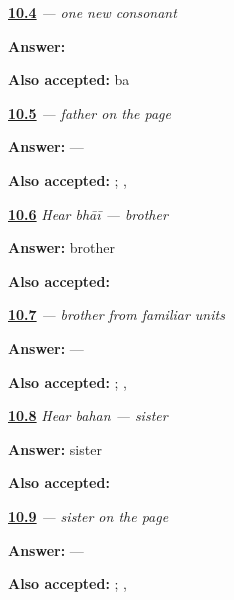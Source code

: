 \noindent\begin{minipage}[t]{\linewidth}
\raggedright
\hyperlink{review-MW-W08-ba-write}{\textbf{10.4}} \emph{ — one new consonant}\par
\small \textbf{Answer:} \par
\footnotesize \textbf{Also accepted:}  ba
\end{minipage}\par\medskip

\noindent\begin{minipage}[t]{\linewidth}
\raggedright
\hyperlink{review-MW-C08-baap-pair}{\textbf{10.5}} \emph{ — father on the page}\par
\small \textbf{Answer:}  — \par
\footnotesize \textbf{Also accepted:}  ; , 
\end{minipage}\par\medskip

\noindent\begin{minipage}[t]{\linewidth}
\raggedright
\hyperlink{review-MW-C08-hear-bhai-meaning}{\textbf{10.6}} \emph{Hear \emph{bhāī} — brother}\par
\small \textbf{Answer:} brother\par
\footnotesize \textbf{Also accepted:} 
\end{minipage}\par\medskip

\noindent\begin{minipage}[t]{\linewidth}
\raggedright
\hyperlink{review-MW-C08-bhai-dictation}{\textbf{10.7}} \emph{ — brother from familiar units}\par
\small \textbf{Answer:}  — \par
\footnotesize \textbf{Also accepted:}  ; , 
\end{minipage}\par\medskip

\noindent\begin{minipage}[t]{\linewidth}
\raggedright
\hyperlink{review-MW-C08-hear-bahan-meaning}{\textbf{10.8}} \emph{Hear \emph{bahan} — sister}\par
\small \textbf{Answer:} sister\par
\footnotesize \textbf{Also accepted:} 
\end{minipage}\par\medskip

\noindent\begin{minipage}[t]{\linewidth}
\raggedright
\hyperlink{review-MW-C08-bahan-siblings}{\textbf{10.9}} \emph{ — sister on the page}\par
\small \textbf{Answer:}  — \par
\footnotesize \textbf{Also accepted:}  ; , 
\end{minipage}\par\medskip

